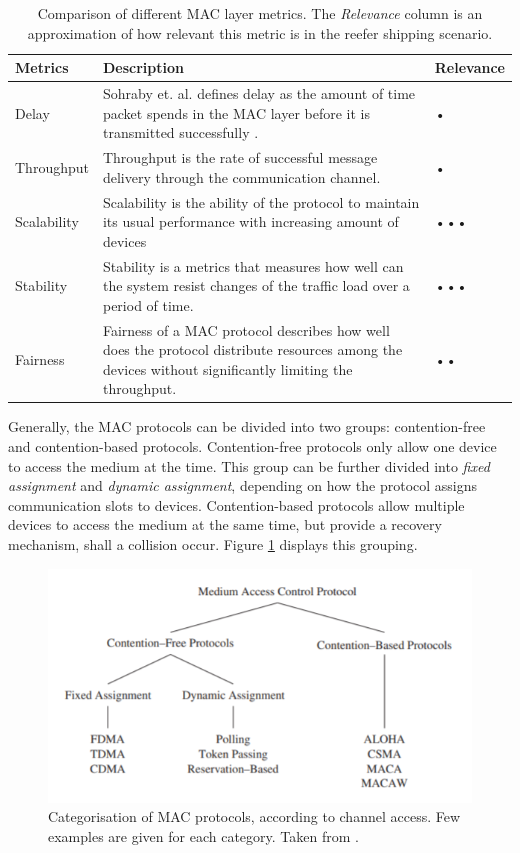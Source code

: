\begin{table}[htbp]
    \centering
    \begin{tabularx}{\textwidth}{|l|X|p{5em}|}
    \hline
    \textbf{Metrics}&\textbf{Description}&\textbf{Relevance}\\
    \hline
    Delay&Sohraby et. al. defines delay as the amount of time packet spends in the MAC layer before it is transmitted successfully \cite{Sohraby2007WirelessApplications}.&•\\
    \hline
    Throughput&Throughput is the rate of successful message delivery through the communication channel.&•\\
    \hline
    Scalability&Scalability is the ability of the protocol to maintain its usual performance with increasing amount of devices&•••\\
    \hline
    Stability&Stability is a metrics that measures how well can the system resist changes of the traffic load over a period of time.&•••\\
    \hline
    Fairness&Fairness of a MAC protocol describes how well does the protocol distribute resources among the devices without significantly limiting the throughput.&••\\
    \hline
    \end{tabularx}
    \caption{Comparison of different MAC layer metrics. The \textit{Relevance} column is an approximation of how relevant this metric is in the reefer shipping scenario.}
    \label{tab:mac-metrics}
\end{table}

Generally, the MAC protocols can be divided into two groups: contention-free and contention-based protocols. Contention-free protocols only allow one device to access the medium at the time. This group can be further divided into \textit{fixed assignment} and \textit{dynamic assignment}, depending on how the protocol assigns communication slots to devices. Contention-based protocols allow multiple devices to access the medium at the same time, but provide a recovery mechanism, shall a collision occur. Figure \ref{fig:mac-categories} displays this grouping.

\begin{figure}[ht]
    \centering
    \includegraphics{00images/mac-categories}
    \caption{Categorisation of MAC protocols, according to channel access. Few examples are given for each category. Taken from \cite{2011MediumControl}.}
    \label{fig:mac-categories}
\end{figure}